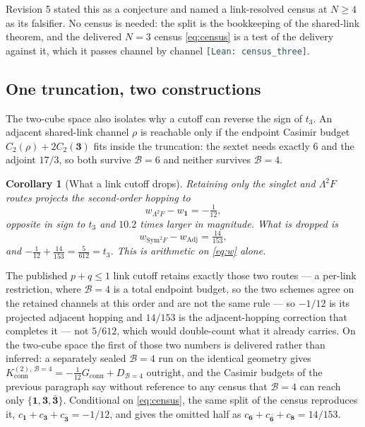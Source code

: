 \documentclass[11pt]{article}
\theoremstyle{plain}
\newtheorem{corollary}[theorem]{Corollary}
\theoremstyle{definition}
\theoremstyle{remark}
\newcommand{\chk}[1]{}
\newcommand{\leanref}[1]{{\footnotesize\textcolor{DarkSlateGray}{\texttt{[Lean: #1]}}}}
\begin{document}
\noindent Revision 5 stated this as a conjecture and named a link-resolved
census at $N\ge4$ as its falsifier. No census is needed: the split is the
bookkeeping of the shared-link theorem, and the delivered $N=3$ census
\eqref{eq:census} is a test of the delivery against it, which it passes
channel by channel \leanref{census\_three}.

\subsection{One truncation, two constructions}

The two-cube space also isolates why a cutoff can reverse the sign of $t_3$.
An adjacent shared-link channel $\rho$ is reachable only if the endpoint
Casimir budget $C_2(\rho)+2C_2(\mathbf 3)$ fits inside the truncation: the
sextet needs exactly $6$ and the adjoint $17/3$, so both survive
$\mathcal B=6$ and neither survives $\mathcal B=4$.
\chk{B=6 retains every adjacent shared-link channel; B=4 provably cannot}

\begin{corollary}[What a link cutoff drops]\label{cor:cutoff}
Retaining only the singlet and $\Lambda^2F$ routes projects the second-order
hopping to
\[
  w_{\Lambda^2F}-w_{\mathbf 1}=-\tfrac1{12},
\]
opposite in sign to $t_3$ and $10.2$ times larger in magnitude. What is
dropped is
\[
  w_{\mathrm{Sym}^2F}-w_{\mathrm{Adj}}=\tfrac{14}{153},
\]
and $-\tfrac1{12}+\tfrac{14}{153}=\tfrac5{612}=t_3$. This is arithmetic on
\eqref{eq:w} alone.
\end{corollary}

\noindent The published $p+q\le1$ link cutoff retains exactly those two
routes --- a per-link restriction, where $\mathcal B=4$ is a total endpoint
budget, so the two schemes agree on the retained channels at this order and are
not the same rule --- so $-1/12$ is its projected adjacent hopping and
$14/153$ is the adjacent-hopping correction that completes it --- not
$5/612$, which would double-count what it already carries. On the two-cube
space the first of those two numbers is delivered rather than inferred: a
separately sealed $\mathcal B=4$ run on the identical geometry gives
$K^{(2),\,\mathcal B=4}_{\mathrm{conn}}=-\tfrac1{12}G_{\mathrm{conn}}+D_{\mathcal B=4}$
outright, and the Casimir budgets of the previous paragraph say without
reference to any census that $\mathcal B=4$ can reach only
$\{\mathbf1,\mathbf3,\bar{\mathbf3}\}$. Conditional on \eqref{eq:census}, the
same split of the census reproduces it,
$c_{\mathbf 1}+c_{\mathbf 3}+c_{\bar{\mathbf 3}}=-1/12$, and gives the omitted
half as $c_{\mathbf 6}+c_{\bar{\mathbf 6}}+c_{\mathbf 8}=14/153$.
\chk{the B=6 six-channel census IS the Weingarten four-channel ledger, channel by channel}
\chk{FINDING: the T1 link cutoff reverses the sign of t\_3, and 14/153 is what it omits}
\end{document}

